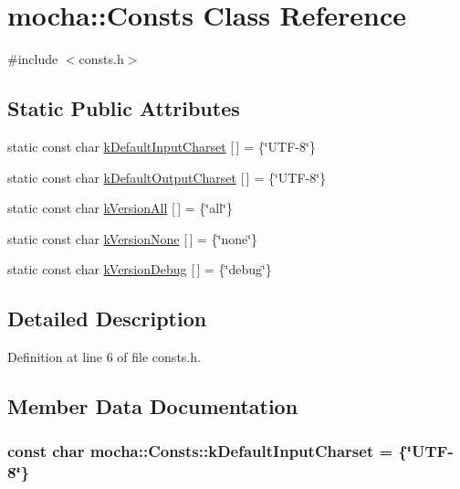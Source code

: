 \hypertarget{classmocha_1_1_consts}{
\section{mocha::Consts Class Reference}
\label{classmocha_1_1_consts}
}


{\ttfamily \#include $<$consts.h$>$}

\subsection*{Static Public Attributes}
\begin{DoxyCompactItemize}
\item 
static const char \hyperlink{classmocha_1_1_consts_a179fff054f4f2aad2d02baaff9f4c9ff}{kDefaultInputCharset} \mbox{[}$\,$\mbox{]} = \{\char`\"{}UTF-\/8\char`\"{}\}
\item 
static const char \hyperlink{classmocha_1_1_consts_a0073c52f88a33a14d03d69f4e90c1d84}{kDefaultOutputCharset} \mbox{[}$\,$\mbox{]} = \{\char`\"{}UTF-\/8\char`\"{}\}
\item 
static const char \hyperlink{classmocha_1_1_consts_a581360da31f08228079ee5bc671c31b7}{kVersionAll} \mbox{[}$\,$\mbox{]} = \{\char`\"{}all\char`\"{}\}
\item 
static const char \hyperlink{classmocha_1_1_consts_a55c2c7c73ea9ace1cd3d4bf4d49c624b}{kVersionNone} \mbox{[}$\,$\mbox{]} = \{\char`\"{}none\char`\"{}\}
\item 
static const char \hyperlink{classmocha_1_1_consts_a15e1b0a8794aa22fd12fe11b68e0f27f}{kVersionDebug} \mbox{[}$\,$\mbox{]} = \{\char`\"{}debug\char`\"{}\}
\end{DoxyCompactItemize}


\subsection{Detailed Description}


Definition at line 6 of file consts.h.



\subsection{Member Data Documentation}
\hypertarget{classmocha_1_1_consts_a179fff054f4f2aad2d02baaff9f4c9ff}{
\subsubsection[{kDefaultInputCharset}]{\setlength{\rightskip}{0pt plus 5cm}const char {\bf mocha::Consts::kDefaultInputCharset} = \{\char`\"{}UTF-\/8\char`\"{}\}}}
\label{classmocha_1_1_consts_a179fff054f4f2aad2d02baaff9f4c9ff}


